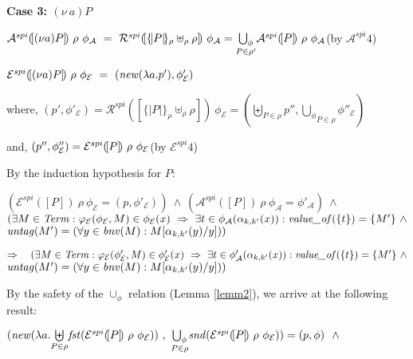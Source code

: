 \documentclass[10pt,a4paper,final,oneside,fleqn]{book}
\begin{document}
\noindent
{\bf Case 3: $(\nu~\!a)P$}

\noindent
$\mathcal{A}^{spi}(\![(\nu a)P]\!)~\rho~\phi_\mathcal{A}~=~\mathcal{R}^{spi}(\![\{\!|P|\!\}_\rho\uplus_\rho\rho]\!)~\phi_\mathcal{A}=\underset{P\in\rho'}{\bigcup_\phi}\mathcal{A}^{spi}(\![P]\!)~\rho~\phi_\mathcal{A}\hfill$(by $\mathcal{A}^{spi}4$)

\noindent
$\mathcal{E}^{spi}(\![(\nu a)P]\!)~\rho~\phi_\mathcal{E}~=~(\mbox{{\itshape new\/}}(\lambda a.p'),\phi'_\mathcal{E})$

\noindent
where, $(p',\phi'_\mathcal{E})=\mathcal{R}^{spi}(\![\{\!|P|\!\}_\rho\uplus_\rho\rho]\!)~\phi_\mathcal{E}=(\underset{P\in\rho}{\biguplus}p'',\underset{P\in\rho}{\bigcup_\phi}\phi''_\mathcal{E})$

\noindent
and, $(p'',\phi''_\mathcal{E})=\mathcal{E}^{spi}(\![P]\!)~\rho~\phi_\mathcal{E}\hfill$(by $\mathcal{E}^{spi}4$)\vspace{4mm}

\noindent
By the induction hypothesis for $P$:

\noindent
$(\mathcal{E}^{spi}(\![P]\!)~\rho~\phi_\mathcal{E}=(p,\phi'_\mathcal{E}))~\wedge~(\mathcal{A}^{spi}(\![P]\!)~\rho~\phi_\mathcal{A}=\phi'_\mathcal{A})~\wedge$\\
$(\exists M\in\mbox{{\itshape Term\/}}:\varphi_\mathcal{E}(\phi_\mathcal{E},M)\in\phi_\mathcal{E}(x)~\Rightarrow~\exists t\in\phi_\mathcal{A}(\alpha_{k,k'}(x)):\mbox{{\itshape value\_of\/}}(\{t\})=\{M'\}~\wedge$\\
$\mbox{{\itshape untag\/}}(M')=(\forall y\in\mbox{{\itshape bnv\/}}(M):M[\alpha_{k,k'}(y)/y]))$\vspace{4mm}

\noindent
$\Rightarrow~~~(\exists M\in\mbox{{\itshape Term\/}}:\varphi_\mathcal{E}(\phi'_\mathcal{E},M)\in\phi'_\mathcal{E}(x)~\Rightarrow~\exists t\in\phi'_\mathcal{A}(\alpha_{k,k'}(x)): \mbox{{\itshape value\_of\/}}(\{t\})=\{M'\}~\wedge$\\
$\mbox{{\itshape untag\/}}(M')=(\forall y\in\mbox{{\itshape bnv\/}}(M):M[\alpha_{k,k'}(y)/y]))$\vspace{4mm}

\noindent
By the safety of the $\cup_\phi$ relation (Lemma \ref{lemm2}), we arrive at the following result:

\noindent
$(\mbox{{\itshape new\/}}(\lambda a.\underset{P\in\rho}{\biguplus}\mbox{{\itshape fst\/}}(\mathcal{E}^{spi}(\![P]\!)~\rho~\phi_\mathcal{E}))~,~\underset{P\in\rho}{\bigcup_\phi}\mbox{{\itshape snd\/}}(\mathcal{E}^{spi}(\![P]\!)~\rho~\phi_\mathcal{E}))=(p,\phi)~~\wedge$
\end{document}
